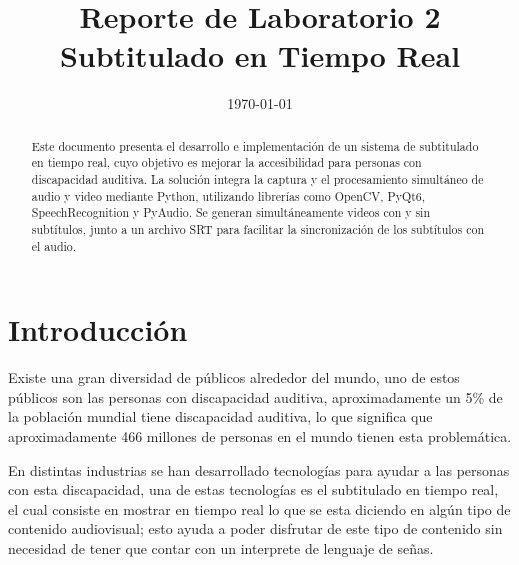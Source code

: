 \documentclass[conference]{IEEEtran}
\date{\specialdate\today}
\begin{document}
\newcommand{\breite}{0.9} %
\newcommand{\RelacionFiguradoscolumnas}{0.9}
\newcommand{\RelacionFiguradoscolumnasPuntoCinco}{0.45}

\title{Reporte de Laboratorio 2 \\ Subtitulado en Tiempo Real}

\author{
}

\maketitle

\begin{abstract}
Este documento presenta el desarrollo e implementación de un sistema de subtitulado en tiempo real, cuyo objetivo es mejorar la accesibilidad para personas con discapacidad auditiva. La solución integra la captura y el procesamiento simultáneo de audio y video mediante Python, utilizando librerías como OpenCV\cite{OpenCV}, PyQt6\cite{PyQt6}, SpeechRecognition\cite{SpeechRecognition} y PyAudio\cite{PyAudio}. Se generan simultáneamente videos con y sin subtítulos, junto a un archivo SRT para facilitar la sincronización de los subtítulos con el audio.
\end{abstract}

\section{Introducción}
Existe una gran diversidad de públicos alrededor del mundo, uno de estos públicos son las personas con discapacidad auditiva, aproximadamente un 5\% de la población mundial tiene discapacidad auditiva, lo que significa que aproximadamente 466 millones de personas en el mundo tienen esta problemática. \cite{OMS}

En distintas industrias se han desarrollado tecnologías para ayudar a las personas con esta discapacidad, una de estas tecnologías es el subtitulado en tiempo real, el cual consiste en mostrar en tiempo real lo que se esta diciendo en algún tipo de contenido audiovisual; esto ayuda a poder disfrutar de este tipo de contenido sin necesidad de tener que contar con un interprete de lenguaje de señas.
\end{document}
